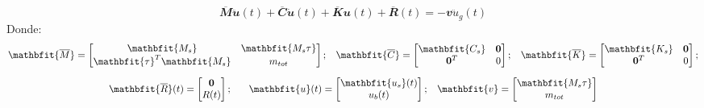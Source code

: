 \begin{equation}\label{Cap3_Eq7}
\mathbfit{\overline{M}\ddot{u}}(t)+\mathbfit{\overline{C}\dot{u}}(t)+\mathbfit{\overline{K}u}(t)+\mathbfit{\overline{R}}(t)=-\mathbfit{v}\ddot{u}_{g}(t)
\end{equation}
Donde: 
\begin{subequations}\label{Cap3_Eq8}
\begin{gather}
\mathbfit{\overline{M}}=\begin{bmatrix}
\mathbfit{M_{s}} & \mathbfit{M_{s} \tau} \\ 
\mathbfit{\tau}^{T} \mathbfit{M_{s}}  & m_{tot}
\end{bmatrix};\hspace{3mm} 
\mathbfit{\overline{C}}=\begin{bmatrix}
\mathbfit{C_{s}}  & \mathbf{0}\\ 
\mathbf{0}^{T}      & 0
\end{bmatrix}; \hspace{3mm} 
\mathbfit{\overline{K}}=\begin{bmatrix}
\mathbfit{K_{s}}  & \mathbf{0}\\ 
\mathbf{0}^{T}      & 0
\end{bmatrix};		\label{Cap3_Eq8_1} \\[2 mm]
\mathbfit{\overline{R}}(t)=\begin{bmatrix}
\mathbf{0}\\ 
R(t)
\end{bmatrix};\hspace{6mm} 
\mathbfit{u}(t)=\begin{bmatrix}
\mathbfit{u_{s}}(t)\\ 
u_{b}(t)
\end{bmatrix};\hspace{3mm} 
\mathbfit{v}=\begin{bmatrix}
\mathbfit{M_{s} \tau} \\ 
m_{tot}
\end{bmatrix}
		\label{Cap3_Eq8_2}
\end{gather}
\end{subequations}

